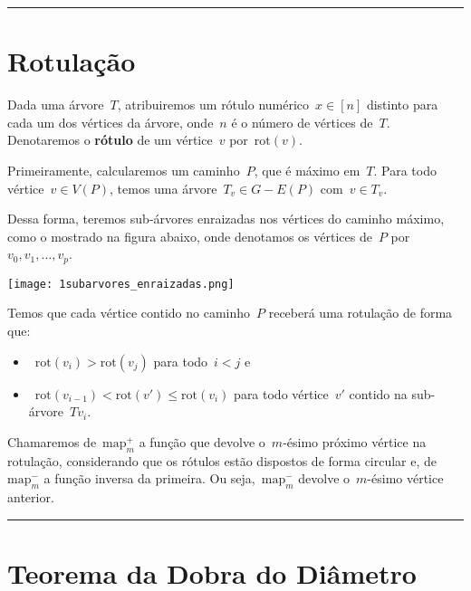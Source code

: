 \documentclass[a0,portrait]{a0poster}
\newcommand{\rot}{\mathrm{rot}}
\newcommand{\map}{\mathrm{map}}
\begin{document}
\begin{multicols}{3}
\noindent\rule[0.5ex]{\linewidth}{1pt}



\section*{Rotulação}

	Dada uma árvore~$T$, atribuiremos um 
	rótulo numérico~${x\in [n]}$ distinto para cada um dos vértices 
	da árvore, onde~$n$ é o número de vértices de~$T$. 
	Denotaremos o \textbf{rótulo} de um vértice~$v$ por~$\rot(v)$.

	Primeiramente, calcularemos 
	um caminho~$P$, que é máximo em~$T$. 
	Para todo vértice~${v\in V(P)}$, temos uma 
	árvore~${T_v \in G - E(P)}$ com~$v\in T_v$.

	Dessa forma, teremos sub-árvores enraizadas nos vértices do
	caminho máximo, como o mostrado na figura abaixo, onde denotamos
	os vértices de~$P$ por~${v_0,v_1,\ldots,v_p}$.
    
\begin{center}
\texttt{[image: 1subarvores\_enraizadas.png]}
\end{center}

	Temos que cada vértice contido no caminho~$P$ receberá 
	uma rotulação de forma que:
	\begin{itemize}
		\item~${\rot(v_i)>\rot(v_j)}$ para todo~${i<j}$ e
		\item~${\rot(v_{i-1})<\rot(v') \le \rot(v_i)}$ para todo 
		vértice~$v'$ contido na sub-árvore~$T{v_i}$. 
	\end{itemize}
    
	Chamaremos de~${\map^+_m}$ a função que devolve o~$m$-ésimo 
	próximo vértice na rotulação, considerando que os rótulos
	estão dispostos de forma circular
	e, de~${\map^-_m}$ a função inversa da primeira. 
	Ou seja,~${\map^-_m}$ devolve o~$m$-ésimo vértice anterior.

\noindent\rule[0.5ex]{\linewidth}{1pt}



\section*{Teorema da Dobra do Diâmetro}


\end{multicols}
\end{document}
